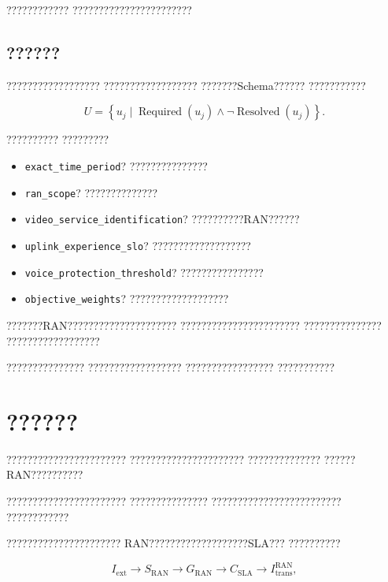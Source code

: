 ????????????
???????????????????????


\subsection*{??????}

??????????????????
??????????????????
???????Schema??????
???????????

\begin{equation}
U
=
\left\{
u_j
\mid
\operatorname{Required}(u_j)
\land
\neg\operatorname{Resolved}(u_j)
\right\}.
\label{eq:unresolved_item_set}
\end{equation}

??????????
?????????

\begin{itemize}
    \item \texttt{exact\_time\_period}?
    ???????????????
    \item \texttt{ran\_scope}?
    ??????????????
    \item \texttt{video\_service\_identification}?
    ??????????RAN??????
    \item \texttt{uplink\_experience\_slo}?
    ???????????????????
    \item \texttt{voice\_protection\_threshold}?
    ????????????????
    \item \texttt{objective\_weights}?
    ???????????????????
\end{itemize}

???????RAN?????????????????????
???????????????????????
???????????????
??????????????????

???????????????
??????????????????
?????????????????
???????????

\section{??????}
\label{sec:business_intent_translation}

???????????????????????
??????????????????????
??????????????
??????RAN??????????

???????????????????????
???????????????
?????????????????????????
????????????

??????????????????????
RAN???????????????????SLA???
??????????

\begin{equation}
I_{\mathrm{ext}}
\longrightarrow
S_{\mathrm{RAN}}
\longrightarrow
G_{\mathrm{RAN}}
\longrightarrow
C_{\mathrm{SLA}}
\longrightarrow
I_{\mathrm{trans}}^{\mathrm{RAN}},
\label{eq:intent_translation_reduced}
\end{equation}

